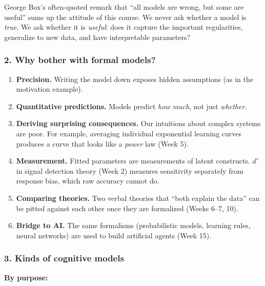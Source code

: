 George Box's often-quoted remark that ``all models are wrong, but some
are useful'' sums up the attitude of this course. We never ask whether a
model is \emph{true}. We ask whether it is \emph{useful}: does it
capture the important regularities, generalize to new data, and have
interpretable parameters?

\subsubsection{2. Why bother with formal models?}

\begin{enumerate}
\def\labelenumi{\arabic{enumi}.}
\tightlist
\item
  \textbf{Precision.} Writing the model down exposes hidden assumptions
  (as in the motivation example).
\item
  \textbf{Quantitative predictions.} Models predict \emph{how much}, not
  just \emph{whether}.
\item
  \textbf{Deriving surprising consequences.} Our intuitions about
  complex systems are poor. For example, averaging individual
  exponential learning curves produces a curve that looks like a
  \emph{power} law (Week 5).
\item
  \textbf{Measurement.} Fitted parameters are measurements of latent
  constructs. \(d'\) in signal detection theory (Week 2) measures
  sensitivity separately from response bias, which raw accuracy cannot
  do.
\item
  \textbf{Comparing theories.} Two verbal theories that ``both explain
  the data'' can be pitted against each other once they are formalized
  (Weeks 6--7, 10).
\item
  \textbf{Bridge to AI.} The same formalisms (probabilistic models,
  learning rules, neural networks) are used to build artificial agents
  (Week 15).
\end{enumerate}

\subsubsection{3. Kinds of cognitive models}

\textbf{By purpose:}

